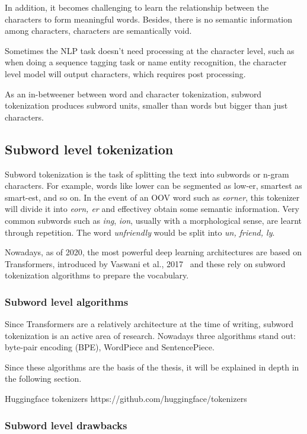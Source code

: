 In addition, it becomes challenging to learn the relationship between the characters to form meaningful words. Besides, there is no semantic information among characters, characters are semantically void.

Sometimes the NLP task doesn't need processing at the character level, such as when doing a sequence tagging task or name entity recognition, the character level model will output characters, which requires post processing.

As an in-betweener between word and character tokenization, subword tokenization produces subword units, smaller than words but bigger than just characters.

\subsection{Subword level tokenization}

Subword tokenization is the task of splitting the text into subwords or n-gram characters. For example, words like lower can be segmented as low-er, smartest as smart-est, and so on. In the event of an OOV word such as \emph{eorner}, this tokenizer will divide it into \emph{eorn, er} and effectivey obtain some semantic information. Very common subwords such as \emph{ing}, \emph{ion}, usually with a morphological sense, are learnt through repetition. The word \emph{unfriendly} would be split into \emph{un, friend, ly}.

Nowadays, as of 2020, the most powerful deep learning architectures are based on Transformers, introduced by Vaswani et al., 2017~\cite{vaswani2017attention} and these rely on subword tokenization algorithms to prepare the vocabulary.

\subsubsection{Subword level algorithms}

Since Transformers are a relatively architecture at the time of writing, subword tokenization is an active area of research. Nowadays three algorithms stand out: byte-pair encoding (BPE), WordPiece and SentencePiece.

Since these algorithms are the basis of the thesis, it will be explained in depth in the following section.

Huggingface tokenizers https://github.com/huggingface/tokenizers

\subsubsection{Subword level drawbacks}


